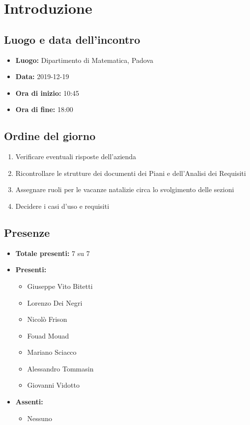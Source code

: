 \section*{Introduzione}

\subsection*{Luogo e data dell'incontro}
	\begin{itemize}
		\item \textbf{Luogo:} Dipartimento di Matematica, Padova
		\item \textbf{Data:} 2019-12-19
		\item \textbf{Ora di inizio:} 10:45
		\item \textbf{Ora di fine:} 18:00
	\end{itemize}

\subsection*{Ordine del giorno}
	\begin{enumerate}
		\item Verificare eventuali risposte dell'azienda
		\item  Ricontrollare le strutture dei documenti dei Piani e dell'Analisi dei Requisiti
		\item  Assegnare ruoli per le vacanze natalizie circa lo svolgimento delle sezioni
		\item  Decidere i casi d'uso e requisiti
	\end{enumerate}

\subsection*{Presenze}
	\begin{itemize}
		\item \textbf{Totale presenti:} 7 su 7
		\item \textbf{Presenti: }
			\begin{itemize}			
				\item Giuseppe Vito Bitetti
				\item Lorenzo Dei Negri
				\item Nicolò Frison
				\item Fouad Mouad
				\item Mariano Sciacco
				\item Alessandro Tommasin
				\item Giovanni Vidotto
			\end{itemize}
		\item \textbf{Assenti: } 
			\begin{itemize}	
				\item Nessuno
			\end{itemize}
	\end{itemize}


